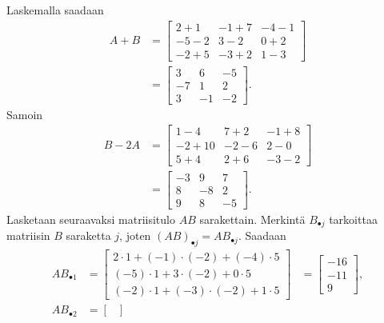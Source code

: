 \documentclass[11pt,a4paper]{amsart}
\begin{document}
\begin{solution}
  Laskemalla saadaan
  \[
    \begin{aligned}
      A + B &=
      \begin{bmatrix}
        2 + 1 & -1 + 7 & -4 - 1 \\
        -5 - 2 & 3 - 2 & 0 + 2 \\
        -2 + 5 & -3 + 2 & 1 - 3
      \end{bmatrix} \\
      &=
      \begin{bmatrix}
        3 & 6 & -5 \\
        -7 & 1 & 2 \\
        3 & -1 & -2
      \end{bmatrix}.
    \end{aligned}
  \]
  Samoin
  \[
    \begin{aligned}
      B - 2A &=
      \begin{bmatrix}
        1 - 4 & 7 + 2 & -1 + 8 \\
        -2 + 10 & -2 - 6 & 2 - 0 \\
        5 + 4 & 2 + 6 & -3 - 2
      \end{bmatrix} \\
      &=
      \begin{bmatrix}
        -3 & 9 & 7 \\
        8 & -8 & 2 \\
        9 & 8 & -5
      \end{bmatrix}.
    \end{aligned}
  \]
  Lasketaan seuraavaksi matriisitulo \(AB\) sarakettain. Merkintä
  \(B_{\bullet j}\) tarkoittaa matriisin \(B\) saraketta \(j\), joten
  \((AB)_{\bullet j} = A B_{\bullet j}\). Saadaan
  \[
    \begin{aligned}
      AB_{\bullet 1} &=
      \begin{bmatrix}
        2\cdot 1 + (-1)\cdot(-2) + (-4)\cdot 5 \\
        (-5)\cdot 1 + 3\cdot(-2) + 0\cdot 5 \\
        (-2)\cdot 1 + (-3)\cdot(-2) + 1\cdot 5
      \end{bmatrix}
      &=
      \begin{bmatrix}
        -16 \\
        -11 \\
        9
      \end{bmatrix}, \\
      AB_{\bullet 2} &=
      \begin{bmatrix}

\end{bmatrix}
\end{aligned}\]
\end{solution}
\end{document}
